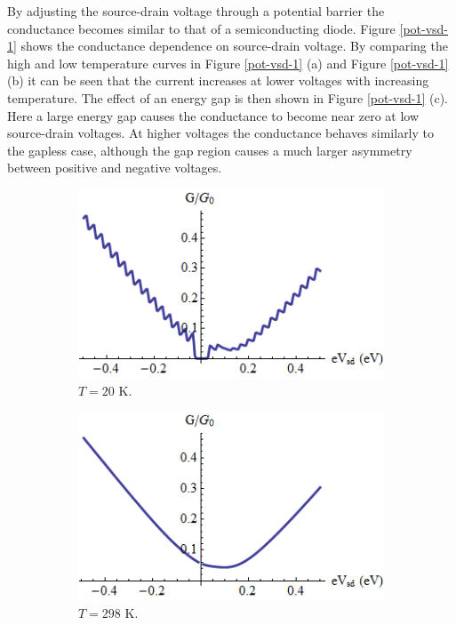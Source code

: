 	By adjusting the source-drain voltage through a potential barrier the conductance becomes similar to that of a semiconducting diode. Figure \ref{pot-vsd-1} shows the conductance dependence on source-drain voltage. By comparing the high and low temperature curves in Figure \ref{pot-vsd-1} (a) and Figure \ref{pot-vsd-1} (b) it can be seen that the current increases at lower voltages with increasing temperature. The effect of an energy gap is then shown in Figure \ref{pot-vsd-1} (c). Here a large energy gap causes the conductance to become near zero at low source-drain voltages. At higher voltages the conductance behaves similarly to the gapless case, although the gap region causes a much larger asymmetry between positive and negative voltages.
		\begin{figure}[h]
			 \begin{subfigure}[h]{0.3\textwidth}
				\centerline{\includegraphics[scale=0.35]{images/pot-vsd-1}}
				\caption{$T=20$ K.}
			\end{subfigure}
			\hspace{0.5cm}
			\begin{subfigure}[h]{0.3\textwidth}
				\centerline{\includegraphics[scale=0.35]{images/pot-vsd-2}}
				\caption{$T=298$ K.}
			\end{subfigure}
			\hspace{0.5cm}
			\begin{subfigure}[h]{0.3\textwidth}

\end{subfigure}
\end{figure}
